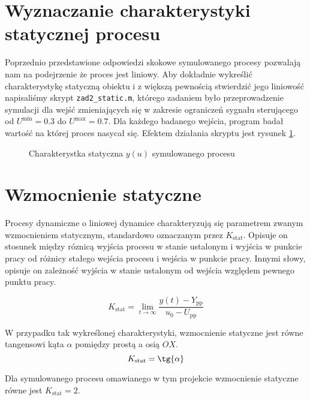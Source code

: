 \section{Wyznaczanie charakterystyki statycznej procesu}
\label{zad2_char_stat}
Poprzednio przedstawione odpowiedzi skokowe symulowanego procesy pozwalają nam
na podejrzenie że proces jest liniowy. Aby dokładnie wykreślić charakterystykę statyczną 
obiektu i z większą pewnością stwierdzić jego liniowość napisaliśmy skrypt \verb+zad2_static.m+,
którego zadaniem było przeprowadzenie symulacji dla wejść zmieniających się w zakresie ograniczeń
sygnału sterującego od $U^{\mathrm{min}} = \num{0.3}$ do $U^{\mathrm{max}} = \num{0.7}$. Dla każdego 
badanego wejścia, program badał wartość na której proces nasycał się. Efektem działania skryptu
jest rysunek \ref{zad2_stat_wykres}. 

\begin{figure}[b]
    \centering
    \caption{Charakterystka statyczna $y(u)$ symulowanego procesu}
    \label{zad2_stat_wykres}
\end{figure}

\section{Wzmocnienie statyczne}
\label{zad2_wzmocnienie}
Procesy dynamiczne o liniowej dynamice charakteryzują się 
parametrem zwanym wzmocnieniem statycznym, 
standardowo oznaczanym przez $K_{\mathrm{stat}}$.
Opisuje on stosunek między róznicą wyjścia procesu w stanie ustalonym i wyjścia w punkcie pracy
od różnicy stałego wejścia procesu i wejścia w punkcie pracy. Innymi słowy, opisuje on zależność
wyjścia w stanie ustalonym od wejścia względem pewnego punktu pracy.

\begin{equation}
K_{\mathrm{stat}} = \lim_{t \to \infty} \frac{y(t)- Y_{\mathrm{pp}}}{u_0 - U_{\mathrm{pp}}}
\label{zad2_wzm_statyczne_wzor}
\end{equation}

W przypadku tak wykreślonej charakterystyki, wzmocnienie statyczne jest równe tangensowi kąta $\alpha$
pomiędzy prostą a osią $OX$. 
\begin{equation}
K_{\mathrm{stat}} = \tg{\alpha}
\label{zad2_wzm_statyczne_wzor_tg}
\end{equation}

Dla symulowanego procesu omawianego w tym projekcie wzmocnienie statyczne 
równe jest $K_{\mathrm{stat}} = 2$. 



